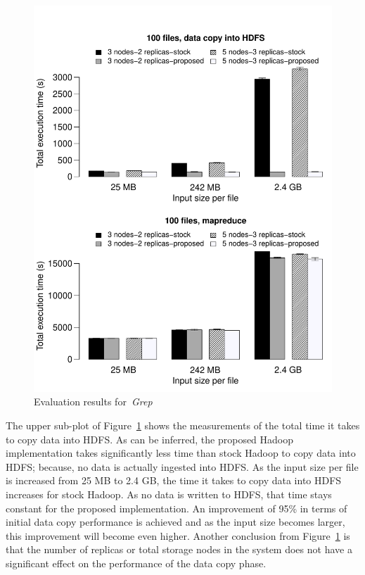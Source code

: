 \begin{figure}[!htbp]
\centering
\includegraphics[width=\columnwidth, keepaspectratio]{result1.pdf}
\caption{Evaluation results for~\textit{Grep}}
\label{grepres}
\end{figure}

The upper sub-plot of Figure~\ref{grepres} shows the measurements of the total time it
takes to copy data into HDFS. As can be inferred, the proposed Hadoop implementation
takes significantly less time than stock Hadoop to copy data into HDFS; because, no
data is actually ingested into HDFS. As the input size per file is
increased from 25 MB to 2.4 GB, the time it takes to copy data into HDFS increases
for stock Hadoop. As no data is written to HDFS, that time stays constant
for the proposed implementation. An improvement of 95\% in terms of 
initial data copy performance is achieved and as the input size becomes larger, this improvement
will become even higher. Another conclusion from Figure~\ref{grepres} is that the
number of replicas or total storage nodes in the system does not have a significant
effect on the performance of the data copy phase.

